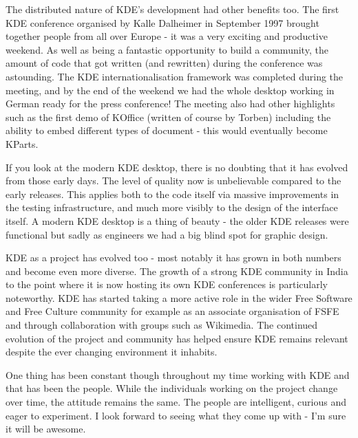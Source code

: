 The distributed nature of KDE's development had other benefits too. The first KDE conference organised by Kalle Dalheimer in September 1997 brought together people from all over Europe - it was a very exciting and productive weekend. As well as being a fantastic opportunity to build a community, the amount of code that got written (and rewritten) during the conference was astounding. The KDE internationalisation framework was completed during the meeting, and by the end of the weekend we had the whole desktop working in German ready for the press conference! The meeting also had other highlights such as the first demo of KOffice (written of course by Torben) including the ability to embed different types of document - this would eventually become KParts.

If you look at the modern KDE desktop, there is no doubting that it has evolved from those early days. The level of quality now is unbelievable compared to the early releases. This applies both to the code itself via massive improvements in the testing infrastructure, and much more visibly to the design of the interface itself. A modern KDE desktop is a thing of beauty - the older KDE releases were functional but sadly as engineers we had a big blind spot for graphic design.

KDE as a project has evolved too - most notably it has grown in both numbers and become even more diverse. The growth of a strong KDE community in India to the point where it is now hosting its own KDE conferences is particularly noteworthy. KDE has started taking a more active role in the wider Free Software and Free Culture community for example as an associate organisation of FSFE and through collaboration with groups such as Wikimedia. The continued evolution of the project and community has helped ensure KDE remains relevant despite the ever changing environment it inhabits.

One thing has been constant though throughout my time working with KDE and that has been the people. While the individuals working on the project change over time, the attitude remains the same. The people are intelligent, curious and eager to experiment. I look forward to seeing what they come up with - I'm sure it will be awesome.
